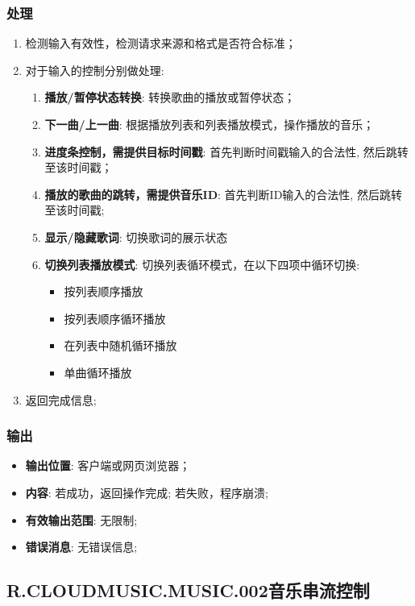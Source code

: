 \subsubsection{处理}
	\begin{enumerate}
		\item 检测输入有效性，检测请求来源和格式是否符合标准；
		\item 对于输入的控制分别做处理: 
		\begin{enumerate}
			\item \textbf{播放/暂停状态转换}: 
				转换歌曲的播放或暂停状态；
			\item \textbf{下一曲/上一曲}: 
				根据播放列表和列表播放模式，操作播放的音乐；
			\item \textbf{进度条控制，需提供目标时间戳}: 
				首先判断时间戳输入的合法性,
				然后跳转至该时间戳；
			\item \textbf{播放的歌曲的跳转，需提供音乐ID}: 
				首先判断ID输入的合法性,
				然后跳转至该时间戳;
			\item \textbf{显示/隐藏歌词}: 
				切换歌词的展示状态
			\item \textbf{切换列表播放模式}: 
				切换列表循环模式，在以下四项中循环切换: 
					\begin{itemize}
						\item 按列表顺序播放
						\item 按列表顺序循环播放
						\item 在列表中随机循环播放
						\item 单曲循环播放
					\end{itemize}
		\end{enumerate}
		\item 返回完成信息;
	\end{enumerate}
\subsubsection{输出}
\begin{itemize}
	\item \textbf{输出位置}: 客户端或网页浏览器；
	\item \textbf{内容}: 若成功，返回操作完成; 若失败，程序崩溃;
	\item \textbf{有效输出范围}: 无限制;
	\item \textbf{错误消息}: 无错误信息;
\end{itemize}

\subsection{R.CLOUDMUSIC.MUSIC.002音乐串流控制}

